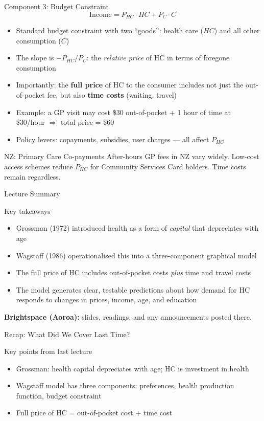 \documentclass[aspectratio=169, 12pt]{beamer}
\newcommand{\recapslide}[1]{%
  \begin{frame}{Recap: What Did We Cover Last Time?}
    \begin{block}{Key points from last lecture}
      \begin{itemize}#1\end{itemize}
    \end{block}
  \end{frame}}
\newcommand{\summaryside}[1]{%
  \begin{frame}{Lecture Summary}
    \begin{exampleblock}{Key takeaways}
      \begin{itemize}#1\end{itemize}
    \end{exampleblock}
    \vspace{0.5em}
    {\footnotesize\textcolor{OtagoGold}{\textbf{Brightspace (Aoroa):}} slides, readings, and any announcements posted there.}
  \end{frame}}
\begin{document}
\begin{frame}{Component 3: Budget Constraint}
  $$\text{Income} = P_{HC} \cdot HC + P_C \cdot C$$
  \begin{itemize}
    \item Standard budget constraint with two ``goods'': health care ($HC$) and all other
          consumption ($C$)
    \item The slope is $-P_{HC}/P_C$: the \emph{relative price} of HC in terms of foregone
          consumption
    \item Importantly: the \textbf{full price} of HC to the consumer includes not just the
          out-of-pocket fee, but also \textbf{time costs} (waiting, travel)
    \item Example: a GP visit may cost \$30 out-of-pocket + 1 hour of time at \$30/hour
          $\Rightarrow$ total price = \$60
    \item Policy levers: copayments, subsidies, user charges --- all affect $P_{HC}$
  \end{itemize}
  \begin{exampleblock}{NZ: Primary Care Co-payments}
    After-hours GP fees in NZ vary widely. Low-cost access schemes reduce $P_{HC}$ for
    Community Services Card holders. Time costs remain regardless.
  \end{exampleblock}
\end{frame}

\summaryside{
  \item Grossman (1972) introduced health as a form of \emph{capital} that depreciates with age
  \item Wagstaff (1986) operationalised this into a three-component graphical model
  \item The full price of HC includes out-of-pocket costs \emph{plus} time and travel costs
  \item The model generates clear, testable predictions about how demand for HC responds to changes in prices, income, age, and education
}


\recapslide{
  \item Grossman: health capital depreciates with age; HC is investment in health
  \item Wagstaff model has three components: preferences, health production function, budget constraint
  \item Full price of HC = out-of-pocket cost + time cost
}
\end{document}
